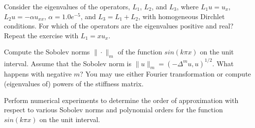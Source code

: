 \begin{exercise}
Consider the eigenvalues of the operators, 
$L_1$, $L_2$, and $L_3$, where
$L_1 u = u_x$, $L_2 u = -\alpha u_{xx}$, $\alpha=1.0e^{-5}$, 
and $L_3 = L_1 + L_2$, with homogeneous Dirchlet conditions. 
For which of the operators are the eigenvalues positive and
real? Repeat the exercise with $L_1 = x u_x$.   
\end{exercise}


\begin{exercise}
Compute the Sobolev norms $\|\cdot\|_m$ of the function $sin(k \pi x)$ on 
the unit interval. Assume that the Sobolev norm is $\|u\|_m = (-\Delta^m u, u)^{1/2}$.     
What happens with negative $m$? You may use either Fourier transformation or 
compute (eigenvalues of) powers of the stiffness matrix. 
\end{exercise}

\begin{exercise}
Perform numerical experiments to determine the order of approximation with respect 
to various Sobolev norms and polynomial orders for the function  
$sin(k \pi x)$ on 
the unit interval.
\end{exercise}








